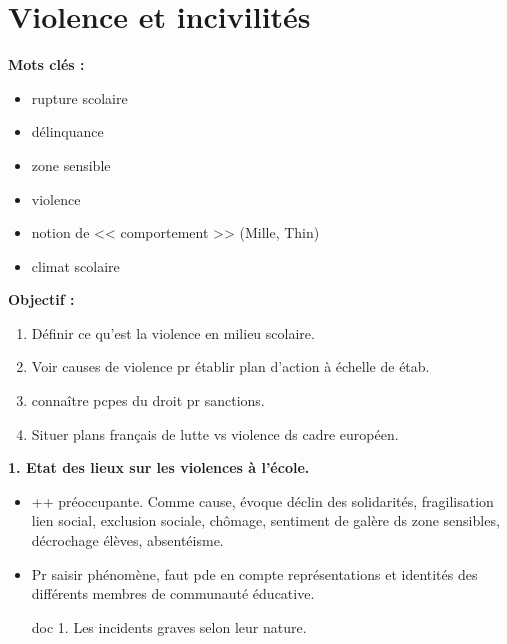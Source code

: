 \documentclass[12pt]{report}
\begin{document}
\begin{itemize}
\begin{itemize}
\end{itemize}



\chapter{Violence et incivilités}

\textbf{Mots clés : }
\begin{itemize}
\item rupture scolaire
\item délinquance
\item zone sensible
\item violence
\item notion de << comportement >> (Mille, Thin)
\item climat scolaire
\end{itemize}

\vspace{0.5cm}

\textbf{Objectif :}


\begin{enumerate}
\item Définir ce qu'est la violence en milieu scolaire.\\
\item Voir causes de violence pr établir plan d'action à échelle de étab.\\
\item connaître pcpes du droit pr sanctions. \\
\item Situer plans français de lutte vs violence ds cadre européen.\\
\end{enumerate}

\textbf{1. Etat des lieux sur les violences à l'école.}

\begin{itemize}
\item ++ préoccupante. Comme cause, évoque déclin des solidarités, fragilisation lien social, exclusion sociale, chômage, sentiment de galère ds zone sensibles, décrochage élèves, absentéisme. \\

\item Pr saisir phénomène, faut pde en compte représentations et identités des différents membres de communauté éducative.

doc 1. Les incidents graves selon leur nature.


\end{itemize}
\end{itemize}
\end{document}
